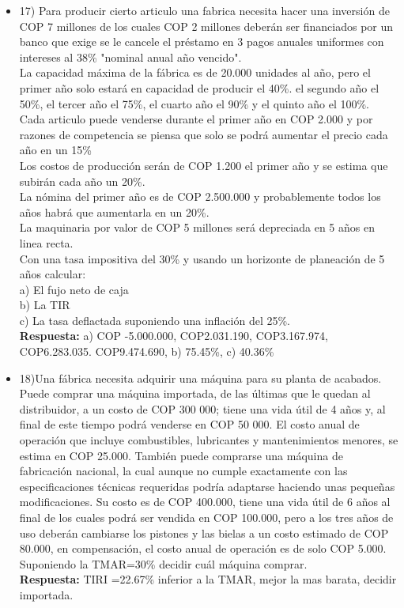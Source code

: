 \begin{itemize}
 \item 17)	Para producir cierto articulo una fabrica necesita hacer una inversión de COP 7 millones de los cuales COP 2 millones deberán ser financiados por un banco que exige se le cancele el préstamo en 3 pagos anuales uniformes con intereses al 38\% "nominal anual año vencido".\\
       La capacidad máxima de la fábrica es de 20.000 unidades al año, pero el primer año solo estará en capacidad de producir el 40\%. el segundo año el 50\%, el tercer año
       el 75\%, el cuarto año el 90\% y el quinto año el 100\%.\\
       Cada articulo puede venderse durante el primer año en COP 2.000 y por razones de competencia se piensa que solo se podrá aumentar el precio cada año en un 15\%\\
       Los costos de producción serán de COP 1.200 el primer año y se estima que subirán cada año un 20\%.\\
       La nómina del primer año es de COP 2.500.000 y probablemente todos los años habrá que aumentarla en un 20\%.\\
       La maquinaria por valor de COP 5 millones será depreciada en 5 años en linea recta.\\
       Con una tasa impositiva del 30\% y usando un horizonte de planeación de 5 años calcular:\\
       a) El fujo neto de caja\\
       b) La TIR\\
       c) La tasa deflactada suponiendo una inflación del 25\%.\\
       \textbf{Respuesta:} a) COP -5.000.000, COP2.031.190, COP3.167.974, COP6.283.035. COP9.474.690, b) 75.45\%, c) 40.36\%
       \medskip

 \item 18)Una fábrica necesita adquirir una máquina para su planta de acabados. Puede comprar una máquina importada, de las últimas que le quedan al distribuidor, a un costo de COP 300 000; tiene una vida útil de 4 años y, al final de este tiempo podrá venderse en COP 50 000. El costo anual de operación que incluye combustibles, lubricantes y mantenimientos menores, se estima en COP 25.000. También puede comprarse una máquina de fabricación nacional, la cual aunque no cumple exactamente con las especificaciones técnicas requeridas podría adaptarse haciendo unas pequeñas modificaciones. Su costo es de COP 400.000, tiene una vida útil de 6 años al final de los cuales podrá ser vendida en COP 100.000, pero a los tres años de uso deberán cambiarse los pistones y las bielas a un costo estimado de COP 80.000, en compensación, el costo anual de operación es de solo COP 5.000. Suponiendo la TMAR=30\% decidir cuál máquina comprar.\\
       \textbf{Respuesta:} TIRI =22.67\% inferior a la TMAR, mejor la mas barata, decidir importada.
       \medskip


\end{itemize}
